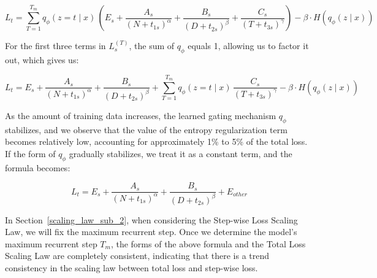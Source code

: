 \documentclass[]{bytedance_seed}
\newcommand{\1}{\mathbf{1}}
\begin{document}
{$$
L_t = \sum_{T=1}^{T_{m}} q_\phi(z=t \mid x)\, \left(E_s + \frac{A_s}{(N+t_{1s})^\alpha} + \frac{B_s}{(D+t_{2s})^\beta} + \frac{C_s}{(T+t_{3s})^\gamma}\right) - \beta \cdot H(q_\phi(z \mid x))
$$

For the first three terms in $L_s^{(T)}$, the sum of $q_\phi$ equals 1, allowing us to factor it out, which gives us:

$$
L_t = E_s + \frac{A_s}{(N+t_{1s})^\alpha} + \frac{B_s}{(D+t_{2s})^\beta} + \sum_{T=1}^{T_{m}} q_\phi(z=t \mid x)\, \frac{C_s}{(T+t_{3s})^\gamma} - \beta \cdot H(q_\phi(z \mid x))
$$

As the amount of training data increases, the learned gating mechanism $q_\phi$ stabilizes, and we observe that the value of the entropy regularization term becomes relatively low, accounting for approximately 1\% to 5\% of the total loss. If the form of $q_\phi$ gradually stabilizes, we treat it as a constant term, and the formula becomes:

$$
L_t = E_s + \frac{A_s}{(N+t_{1s})^\alpha} + \frac{B_s}{(D+t_{2s})^\beta} + E_{other}
$$

In Section~\ref{scaling_law_sub_2}, when considering the Step-wise Loss Scaling Law, we will fix the maximum recurrent step. Once we determine the model's maximum recurrent step $T_m$, the forms of the above formula and the Total Loss Scaling Law are completely consistent, indicating that there is a trend consistency in the scaling law between total loss and step-wise loss. 

}
\end{document}
